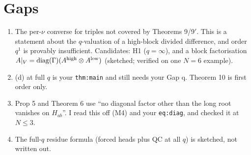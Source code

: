 \documentclass[10pt]{article}
\theoremstyle{plain}
\begin{document}
\section{Gaps}
\begin{enumerate}
\item The per-$\nu$ converse for triples not covered by Theorems 9/9$'$. This is a statement about the $q$-valuation of a high-block divided difference,
and order $q^1$ is provably insufficient. Candidates: H1 ($q=\infty$), and a block factorisation $A|_V=\mathrm{diag}(\Gamma)(A^{\rm high}\otimes
A^{\rm low})$ (sketched; verified on one $N=6$ example).
\item (d) at full $q$ is your \texttt{thm:main} and still needs your Gap q. Theorem 10 is first order only.
\item Prop 5 and Theorem 6 use ``no diagonal factor other than the long root vanishes on $H_{ab}$''. I read this off (M4) and your \texttt{eq:diag}, and checked it at $N\le3$.
\item The full-$q$ residue formula (forced heads plus QC at all $q$) is sketched, not written out.
\end{enumerate}
\end{document}

